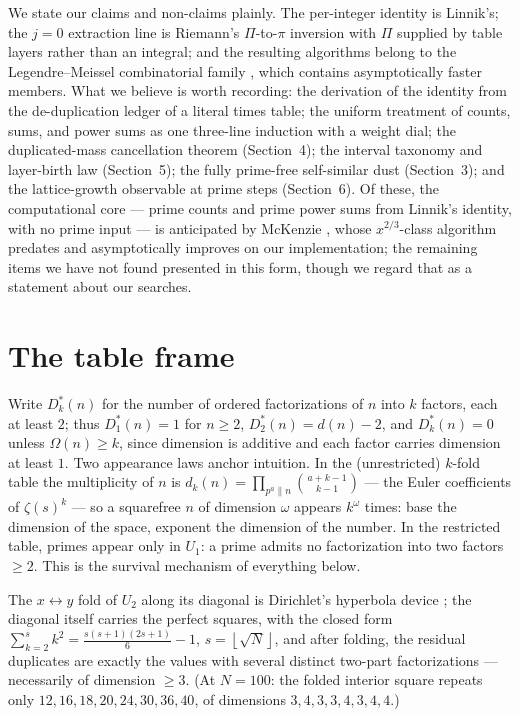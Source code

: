 \documentclass[11pt]{article}
\theoremstyle{remark}
\newcommand{\fl}[1]{\left\lfloor #1 \right\rfloor}
\begin{document}
We state our claims and non-claims plainly. The per-integer identity is Linnik's; the $j = 0$
extraction line is Riemann's $\Pi$-to-$\pi$ inversion \cite{Riemann,Edwards} with $\Pi$ supplied by
table layers rather than an integral; and the resulting algorithms belong to the
Legendre--Meissel combinatorial family \cite{DR,Staple,Orlov,Lucy,McKenzie}, which contains asymptotically
faster members. What we believe is worth recording: the derivation of the identity from the
de-duplication ledger of a literal times table; the uniform treatment of counts, sums, and power sums as
one three-line induction with a weight dial; the duplicated-mass cancellation theorem
(Section~4); the interval taxonomy and layer-birth law (Section~5); the fully prime-free self-similar
dust (Section~3); and the lattice-growth observable at prime steps (Section~6). Of these, the computational core --- prime counts and
prime power sums from Linnik's identity, with no prime input --- is anticipated by McKenzie
\cite{McKenzie}, whose $x^{2/3}$-class algorithm predates and asymptotically improves on our
implementation; the remaining items we have not found presented in this form, though we regard that as
a statement about our searches.

\section{The table frame}

Write $D_k^*(n)$ for the number of ordered factorizations of $n$ into $k$ factors, each at least $2$;
thus $D_1^*(n) = 1$ for $n \ge 2$, $D_2^*(n) = d(n) - 2$, and $D_k^*(n) = 0$ unless $\Omega(n) \ge k$,
since dimension is additive and each factor carries dimension at least $1$. Two appearance laws anchor
intuition. In the (unrestricted) $k$-fold table the multiplicity of $n$ is
$d_k(n) = \prod_{p^a \| n} \binom{a + k - 1}{k - 1}$ --- the Euler coefficients of $\zeta(s)^k$ \cite{HW} --- so a
squarefree $n$ of dimension $\omega$ appears $k^{\omega}$ times: base the dimension of the space,
exponent the dimension of the number. In the restricted table, primes appear only in $U_1$: a prime
admits no factorization into two factors $\ge 2$. This is the survival mechanism of everything below.

The $x \leftrightarrow y$ fold of $U_2$ along its diagonal is Dirichlet's hyperbola device
\cite{Dirichlet}; the diagonal itself carries the perfect squares, with the closed form
$\sum_{k=2}^{s} k^2 = \tfrac{s(s+1)(2s+1)}{6} - 1$, $s = \fl{\sqrt N}$, and after folding, the residual
duplicates are exactly the values with several distinct two-part factorizations --- necessarily of
dimension $\ge 3$. (At $N = 100$: the folded interior square repeats only
$12, 16, 18, 20, 24, 30, 36, 40$, of dimensions $3,4,3,3,4,3,4,4$.)
\end{document}
